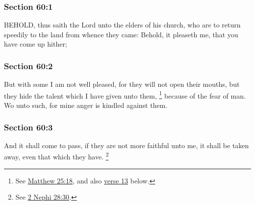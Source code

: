 	\subsubsection{Section 60:1} %
		\label{DC60-1}

		BEHOLD, thus saith the Lord unto the elders of his church, who are to return speedily to the land from whence they came: Behold, it pleaseth me, that you have come up hither;


	\subsubsection{Section 60:2} %
		\label{DC60-2}

		But with some I am not well pleased, for they will not open their mouths, but they hide the talent which I have given unto them,%
			\footnote{%
				See \hyperref[MATTHEW-25-18]{Matthew 25:18}, and also \hyperref[DC60-13]{verse 13} below.
				}
		because of the fear of man.  Wo unto such, for mine anger is kindled against them.


	\subsubsection{Section 60:3} %
		\label{DC60-3}

		And it shall come to pass, if they are not more faithful unto me, it shall be taken away, even that which they have.%
			\footnote{%
				See \hyperref[2NEPHI-28-30]{2 Nephi 28:30}.
				}

